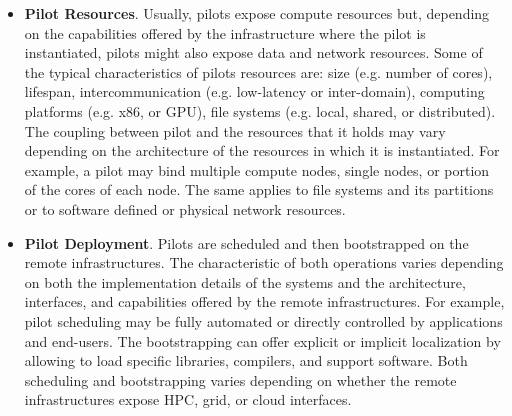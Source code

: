 \documentclass{sig-alternate}
\begin{document}
\begin{itemize}

\item \textbf{Pilot Resources}. Usually, pilots expose compute resources but,
  depending on the capabilities offered by the infrastructure where the pilot
  is instantiated, pilots might also expose data and network resources. Some of
  the typical characteristics of pilots resources are: size (e.g. number of
  cores), lifespan, intercommunication (e.g. low-latency or inter-domain),
  computing platforms (e.g. x86, or GPU), file systems (e.g. local, shared, or
  distributed). The coupling between pilot and the resources that it holds may
  vary depending on the architecture of the resources in which it is
  instantiated. For example, a pilot may bind multiple compute nodes, single
  nodes, or portion of the cores of each node. The same applies to file systems
  and its partitions or to software defined or physical network resources.




\item \textbf{Pilot Deployment}. Pilots are scheduled and then bootstrapped on
  the remote infrastructures. The characteristic of both operations varies
  depending on both the implementation details of the \pilot systems and the
  architecture, interfaces, and capabilities offered by the remote
  infrastructures. For example, pilot scheduling may be fully automated or
  directly controlled by applications and end-users. The bootstrapping can
  offer explicit or implicit localization by allowing to load specific
  libraries, compilers, and support software. Both scheduling and bootstrapping
  varies depending on whether the remote infrastructures expose HPC, grid, or
  cloud interfaces.


\end{itemize}
\end{document}
